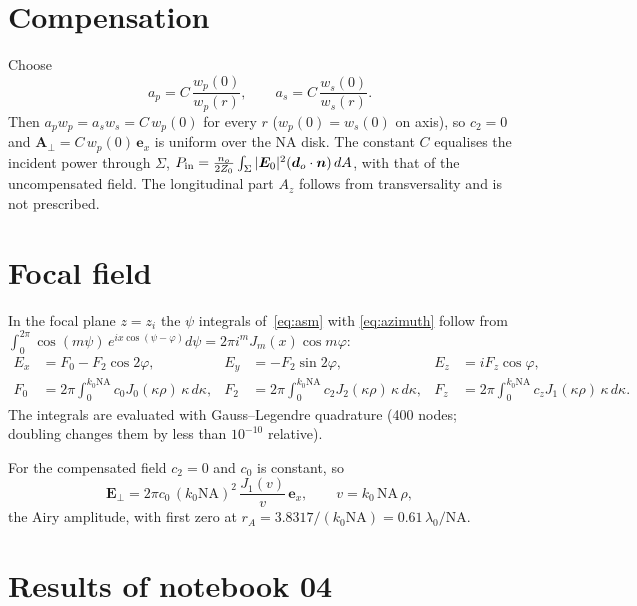 \documentclass[11pt,a4paper]{article}
\newcommand{\ve}[1]{\bm{#1}}
\newcommand{\ex}{\ve e_x}
\begin{document}
\section{Compensation}

Choose
\begin{equation}
 a_p=C\,\frac{w_p(0)}{w_p(r)},\qquad a_s=C\,\frac{w_s(0)}{w_s(r)} .
\end{equation}
Then $a_pw_p=a_sw_s=C\,w_p(0)$ for every $r$ ($w_p(0)=w_s(0)$ on axis), so
$c_2=0$ and $\ve A_\perp=C\,w_p(0)\,\ex$ is uniform over the NA disk. The constant
$C$ equalises the incident power through $\Sigma$,
$P_{\rm in}=\tfrac{n_o}{2Z_0}\int_\Sigma|\ve E_0|^2(\ve d_o\cdot\ve n)\,dA$, with that
of the uncompensated field. The longitudinal part $A_z$ follows from
transversality and is not prescribed.

\section{Focal field}

In the focal plane $z=z_i$ the $\psi$ integrals of~\eqref{eq:asm} with
\eqref{eq:azimuth} follow from
$\int_0^{2\pi}\cos(m\psi)\,e^{ix\cos(\psi-\varphi)}d\psi=2\pi i^mJ_m(x)\cos m\varphi$:
\begin{align}
 E_x&=F_0-F_2\cos2\varphi, & E_y&=-F_2\sin2\varphi, & E_z&=iF_z\cos\varphi,\\
 F_0&=2\pi\!\int_0^{k_0\mathrm{NA}}\!c_0J_0(\kappa\rho)\,\kappa\,d\kappa, &
 F_2&=2\pi\!\int_0^{k_0\mathrm{NA}}\!c_2J_2(\kappa\rho)\,\kappa\,d\kappa, &
 F_z&=2\pi\!\int_0^{k_0\mathrm{NA}}\!c_zJ_1(\kappa\rho)\,\kappa\,d\kappa .
\end{align}
The integrals are evaluated with Gauss--Legendre quadrature (400 nodes; doubling
changes them by less than $10^{-10}$ relative).

For the compensated field $c_2=0$ and $c_0$ is constant, so
\begin{equation}
 \ve E_\perp=2\pi c_0\,(k_0\mathrm{NA})^2\,\frac{J_1(v)}{v}\,\ex,
 \qquad v=k_0\,\mathrm{NA}\,\rho ,
\end{equation}
the Airy amplitude, with first zero at
$r_A=3.8317/(k_0\mathrm{NA})=0.61\,\lambda_0/\mathrm{NA}$.

\section{Results of notebook 04}
\end{document}
